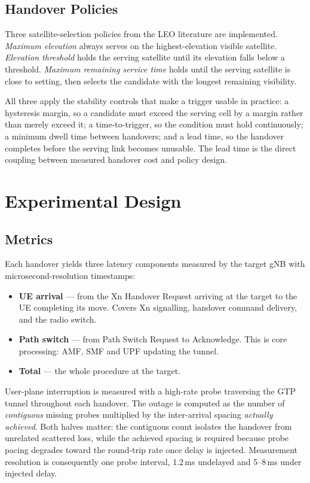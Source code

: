 \documentclass[conference]{IEEEtran}
\begin{document}
\subsection{Handover Policies}

Three satellite-selection policies from the LEO literature are implemented.
\emph{Maximum elevation} always serves on the highest-elevation visible
satellite. \emph{Elevation threshold} holds the serving satellite until its
elevation falls below a threshold. \emph{Maximum remaining service time} holds
until the serving satellite is close to setting, then selects the candidate with
the longest remaining visibility.

All three apply the stability controls that make a trigger usable in practice: a
hysteresis margin, so a candidate must exceed the serving cell by a margin
rather than merely exceed it; a time-to-trigger, so the condition must hold
continuously; a minimum dwell time between handovers; and a lead time, so the
handover completes before the serving link becomes unusable. The lead time is
the direct coupling between measured handover cost and policy design.

\section{Experimental Design}

\subsection{Metrics}

Each handover yields three latency components measured by the target gNB with
microsecond-resolution timestamps:

\begin{itemize}
\item \textbf{UE arrival} --- from the Xn Handover Request arriving at the
target to the UE completing its move. Covers Xn signalling, handover command
delivery, and the radio switch.
\item \textbf{Path switch} --- from Path Switch Request to Acknowledge. This is
core processing: AMF, SMF and UPF updating the tunnel.
\item \textbf{Total} --- the whole procedure at the target.
\end{itemize}

User-plane interruption is measured with a high-rate probe traversing the GTP
tunnel throughout each handover. The outage is computed as the number of
\emph{contiguous} missing probes multiplied by the inter-arrival spacing
\emph{actually achieved}. Both halves matter: the contiguous count isolates the
handover from unrelated scattered loss, while the achieved spacing is required
because probe pacing degrades toward the round-trip rate once delay is injected.
Measurement resolution is consequently one probe interval, 1.2\,ms undelayed
and 5--8\,ms under injected delay.
\end{document}
